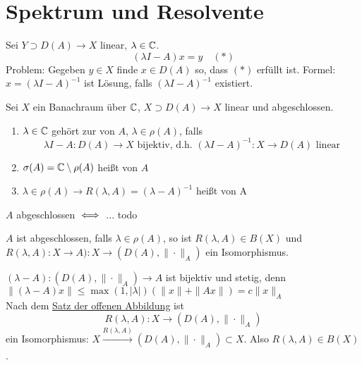 
\section{Spektrum und Resolvente}



Sei $Y \supset D(A) \rightarrow X$ linear, $\lambda \in \mathbb{C}$.
	\[ (\lambda I - A) x = y \quad (*) \label{eq:13.0-lineareGleichung} \]
Problem: Gegeben $y \in X$ finde $x \in D(A)$ so, dass \hyperref[eq:13.0-lineareGleichung]{$(*)$} erfüllt ist.
Formel: $x = (\lambda I - A)^{-1}$ ist Lösung, falls $(\lambda I - A)^{-1}$ existiert.


\begin{definition}
	Sei $X$ ein Banachraum über $\mathbb{C}$, $X \supset D(A) \rightarrow X$ linear und abgeschlossen.
	\begin{enumerate}[label=\alph*\upshape)]
		\item $\lambda \in \mathbb{C}$ gehört zur  von $A$, $\lambda \in \rho(A)$, falls
			\[ \lambda I - A : D(A) \rightarrow X \text{ bijektiv, d.h. } (\lambda I - A)^{-1}: X \rightarrow D(A) \text{ linear} \]
		\item $\sigma(A) = \mathbb{C} \setminus \rho(A)$ hei{\ss}t  von $A$
		\item $\lambda \in \rho(A) \rightarrow R(\lambda, A) = (\lambda - A)^{-1}$ hei{\ss}t  von A
	\end{enumerate}	
\end{definition}


\begin{erinnerung}
	$A$ abgeschlossen $\iff$ ... todo %
\end{erinnerung}


\begin{bemerkung}
	$A$ ist abgeschlossen, falls $\lambda \in \rho(A)$, so ist $R(\lambda, A) \in B(X)$ und $R(\lambda, A): X \rightarrow A): X \rightarrow (D(A), \| \cdot \|_{A})$ ein Isomorphismus.
\end{bemerkung}

\begin{beweis}
	$(\lambda - A): (D(A), \| \cdot \|_{A}) \rightarrow A$ ist bijektiv und stetig, denn $\|(\lambda - A)x \| \leq \max(1, |\lambda|) (\|x\| + \|Ax\|) = c \| x \|_{A}$ \\
	Nach dem \hyperref[satz:10.3-offeneAbbildung]{Satz der offenen Abbildung} ist
		\[ R(\lambda, A): X \rightarrow (D(A), \| \cdot \|_{A}) \]
	ein Isomorphismus: $X \xrightarrow[]{R(\lambda, A)} (D(A), \| \cdot \|_{A}) \subset X$. Also $R(\lambda, A) \in B(X)$.
\end{beweis}



